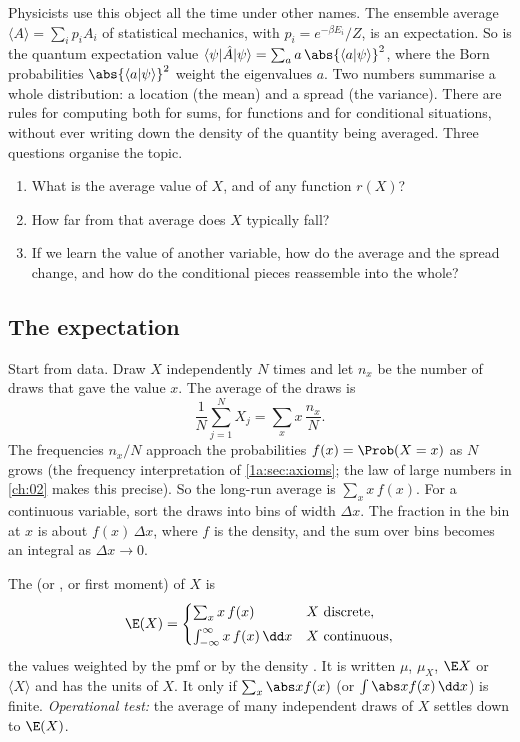 Physicists use this object all the time under other names. The ensemble
average $\langle A\rangle=\sum_ip_iA_i$ of statistical mechanics, with
$p_i=e^{-\beta E_i}/Z$, is an expectation. So is the quantum expectation value
$\langle\psi\rvert\hat A\lvert\psi\rangle=\sum_a a\,\abs{\langle a\vert\psi\rangle}^2$,
where the Born probabilities $\abs{\langle a\vert\psi\rangle}^2$ weight the
eigenvalues $a$. Two numbers summarise a whole distribution: a location (the
mean) and a spread (the variance). There are rules for computing both for
sums, for functions and for conditional situations, without ever writing down
the density of the quantity being averaged. Three questions organise the
topic.
\begin{enumerate}[leftmargin=1.6em,itemsep=1pt]
  \item What is the average value of $X$, and of any function $r(X)$?
  \item How far from that average does $X$ typically fall?
  \item If we learn the value of another variable, how do the average and the
        spread change, and how do the conditional pieces reassemble into the
        whole?
\end{enumerate}

\subsection{The expectation}

Start from data. Draw $X$ independently $N$ times and let $n_x$ be the number
of draws that gave the value $x$. The average of the draws is
\[
  \frac1N\sum_{j=1}^NX_j=\sum_x x\,\frac{n_x}{N} .
\]
The frequencies $n_x/N$ approach the probabilities $f(x)=\Prob(X=x)$ as $N$
grows (the frequency interpretation of \cref{1a:sec:axioms}; the law of large
numbers in \cref{ch:02} makes this precise). So the long-run average is
$\sum_x x\,f(x)$. For a continuous variable, sort the draws into bins of
width $\Delta x$. The fraction in the bin at $x$ is about $f(x)\,\Delta x$,
where $f$ is the density, and the sum over bins becomes an integral as
$\Delta x\to0$.

\begin{workdef}
The  (or , or first moment) of $X$ is
\begin{equation}
  \E(X)=\begin{cases}
    \sum_x x\,f(x) & X\text{ discrete},\\[3pt]
    \int_{-\infty}^{\infty}x\,f(x)\,\dd x & X\text{ continuous},
  \end{cases}
  \label{1b:eq:mean}
\end{equation}
the values weighted by the pmf  or
by the density .
It is written $\mu$, $\mu_X$, $\E X$ or $\langle X\rangle$ and has the units of
$X$. It  only if $\sum_x\abs x f(x)$ (or
$\int\abs x f(x)\,\dd x$) is finite.
\emph{Operational test:} the average of many independent draws of $X$ settles
down to $\E(X)$.
\end{workdef}

